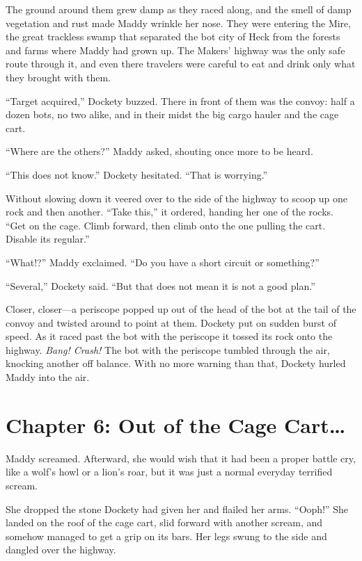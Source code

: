 \documentclass[10pt]{article}
\begin{document}
The ground around them grew damp as they raced along, and the smell of
damp vegetation and rust made Maddy wrinkle her nose. They were entering
the Mire, the great trackless swamp that separated the bot city of Heck
from the forests and farms where Maddy had grown up. The Makers' highway
was the only safe route through it, and even there travelers were
careful to eat and drink only what they brought with them.

``Target acquired,'' Dockety buzzed. There in front of them was the
convoy: half a dozen bots, no two alike, and in their midst the big
cargo hauler and the cage cart.

``Where are the others?'' Maddy asked, shouting once more to be heard.

``This does not know.'' Dockety hesitated. ``That is worrying.''

Without slowing down it veered over to the side of the highway to scoop
up one rock and then another. ``Take this,'' it ordered, handing her one
of the rocks. ``Get on the cage. Climb forward, then climb onto the one
pulling the cart. Disable its regular.''

``What!?'' Maddy exclaimed. ``Do you have a short circuit or
something?''

``Several,'' Dockety said. ``But that does not mean it is not a good
plan.''

Closer, closer---a periscope popped up out of the head of the bot at the
tail of the convoy and twisted around to point at them. Dockety put on
sudden burst of speed. As it raced past the bot with the periscope it
tossed its rock onto the highway. \emph{Bang! Crash!} The bot with the
periscope tumbled through the air, knocking another off balance. With no
more warning than that, Dockety hurled Maddy into the air.

\newpage
\section{Chapter 6: Out of the Cage Cart\ldots{}}

Maddy screamed. Afterward, she would wish that it had been a proper
battle cry, like a wolf's howl or a lion's roar, but it was just a
normal everyday terrified scream.

She dropped the stone Dockety had given her and flailed her arms.
``Ooph!'' She landed on the roof of the cage cart, slid forward with
another scream, and somehow managed to get a grip on its bars. Her legs
swung to the side and dangled over the highway.
\end{document}
